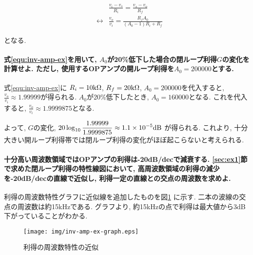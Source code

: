\documentclass[titlepage]{jsarticle}
\begin{document}
            \begin{eqnarray}
                && \frac{v_i - v_s}{R_i} = \frac{v_s - v_o}{R_f} \nonumber \\
                &\leftrightarrow& \frac{v_o}{v_i} = \frac{R_f A_0}{(A_0 - 1)R_i + R_f} \label{equ:inv-amp-ex}
            \end{eqnarray}

            となる.

        \paragraph{
            式\ref{equ:inv-amp-ex}を用いて,
            $A_0$が20\%低下した場合の閉ループ利得$G$の変化を計算せよ.
            ただし, 使用するOPアンプの開ループ利得を$A_0 = 200000$とする. \\
        }
            式\ref{equ:inv-amp-ex}に
            $R_i = 10 \rm{k\Omega}$, $R_f = 20\rm{k\Omega}$,
            $A_0 = 200000$を代入すると,
            $\displaystyle\frac{v_o}{v_i} \approx 1.99999$が得られる.
            $A_0$が20\%低下したとき, $A_0 = 160000$となる.
            これを代入すると,
            $\displaystyle\frac{v_o}{v_i} \approx 1.9999875$となる.

            よって, $G$の変化,
            $\displaystyle20\log_{10}\frac{1.99999}{1.9999875} \approx 1.1 \times 10^{-5} \rm{dB}$
            が得られる.
            これより, 十分大きい開ループ利得帯では閉ループ利得の変化がほぼ起こらないと考えられる.

        \paragraph{
            十分高い周波数領域ではOPアンプの利得は-20dB/decで減衰する.
            \ref{sec:ex1}節で求めた閉ループ利得の特性線図において,
            高周波数領域の利得の減少を-20dB/decの直線で近似し,
            利得一定の直線との交点の周波数を求めよ. \\
        }

            利得の周波数特性グラフに近似線を追加したものを図\ref{fig:inv-amp-ex}
            に示す.
            二本の波線の交点の周波数は約15kHzである.
            グラフより,
            約15kHzの点で利得は最大値から3dB下がっていることがわかる.

            \begin{figure}[h]
                \centering
                \texttt{[image: img/inv-amp-ex-graph.eps]}
                \caption{利得の周波数特性の近似}
                \label{fig:inv-amp-ex}
            \end{figure}
\end{document}
